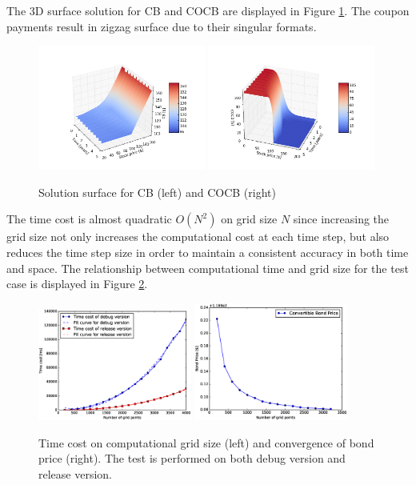\documentclass[12pt]{article}
\begin{document}
The 3D surface solution for CB and COCB are displayed in Figure \ref{fig:surf}. The coupon payments result in zigzag surface due to their singular formats.
\begin{figure}[ht]
\includegraphics[width=0.49\textwidth]{Figures/CBsurf}
\includegraphics[width=0.49\textwidth]{Figures/COCBsurf}
\caption{Solution surface for CB (left) and COCB (right)}
\label{fig:surf}
\end{figure}

The time cost is almost quadratic $O(N^2)$ on grid size $N$ since increasing the grid size not only increases the computational cost at each time step, but also reduces the time step size in order to maintain a consistent accuracy in both time and space. The relationship between computational time and grid size for the test case is displayed in Figure \ref{fig:time_cost}.
\begin{figure}[ht]
\centering
\includegraphics[width=0.45\textwidth]{Figures/timecost}
\includegraphics[width=0.45\textwidth]{Figures/converge}
\caption{Time cost on computational grid size (left) and convergence of bond price (right). The test is performed on both debug version and release version.}
\label{fig:time_cost}
\end{figure}
\end{document}
